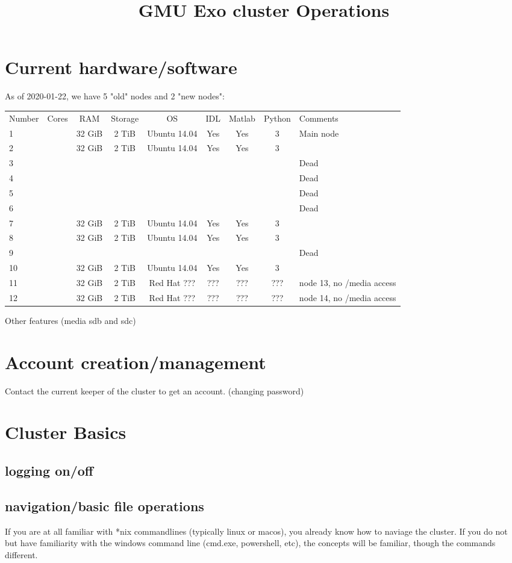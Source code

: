 \documentclass[11pt]{article}
\begin{document}
\title{GMU Exo cluster Operations}

\section{Current hardware/software}
As of 2020-01-22, we have 5 "old" nodes and 2 "new nodes":

\begin{tabular}{l | c | c | c | c | c | c | c | l}
Number & Cores & RAM & Storage & OS & IDL & Matlab & Python & Comments \\
1 & & 32 GiB & 2 TiB & Ubuntu 14.04 & Yes & Yes & 3 & Main node \\
2 & & 32 GiB & 2 TiB & Ubuntu 14.04 & Yes & Yes & 3 & \\
3 & & & & & & & & Dead \\
4 & & & & & & & & Dead \\
5 & & & & & & & & Dead \\
6 & & & & & & & & Dead \\
7 & & 32 GiB & 2 TiB & Ubuntu 14.04 & Yes & Yes & 3 & \\
8 & & 32 GiB & 2 TiB & Ubuntu 14.04 & Yes & Yes & 3 & \\
9 & & & & & & & & Dead \\
10 & & 32 GiB & 2 TiB & Ubuntu 14.04 & Yes & Yes & 3 & \\
11 & & 32 GiB & 2 TiB & Red Hat ??? & ??? & ??? & ??? & node 13, no /media access \\
12 & & 32 GiB & 2 TiB & Red Hat ??? & ??? & ??? & ??? & node 14, no /media access \\
\end{tabular}

Other features (media sdb and sdc)

\section{Account creation/management}
Contact the current keeper of the cluster to get an account.
(changing password)

\section{Cluster Basics}
\subsection{logging on/off}
\subsection{navigation/basic file operations}
If you are at all familiar with *nix commandlines (typically linux or macos), you already know how to naviage the cluster. If you do not but have familiarity with the windows command line (cmd.exe, powershell, etc), the concepts will be familiar, though the commands different.
\end{document}
